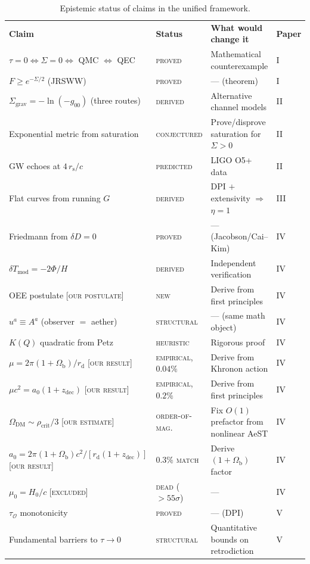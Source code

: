 \documentclass[prd,twocolumn,superscriptaddress,longbibliography,floatfix]{revtex4-2}
\newcommand{\tauasym}{\tau}
\newcommand{\rs}{r_{\mathrm{s}}}
\newcommand{\Sgrav}{\Sigma_{\mathrm{grav}}}
\newcommand{\tauO}{\tauasym_{\mathcal{O}}}
\newcommand{\Tmod}{T_{\mathrm{mod}}}
\newcommand{\OmDM}{\Omega_{\mathrm{DM}}}
\begin{document}
\begin{table}[t]
\caption{\label{tab:honest}Epistemic status of claims in
the unified framework.}
\begin{ruledtabular}
\begin{tabular}{llll}
\textbf{Claim} &
\textbf{Status} &
\textbf{What would change it} &
\textbf{Paper} \\
\colrule
$\tauasym = 0 \Leftrightarrow \Sigma = 0
\Leftrightarrow$ QMC $\Leftrightarrow$ QEC
& \textsc{proved} & Mathematical counterexample & I \\
$F \geq e^{-\Sigma/2}$ (JRSWW)
& \textsc{proved} & --- (theorem) & I \\
$\Sgrav = -\ln(-g_{00})$ (three routes)
& \textsc{derived} & Alternative channel models & II \\
Exponential metric from saturation
& \textsc{conjectured} & Prove/disprove saturation for $\Sigma > 0$ & II \\
GW echoes at $4\,\rs/c$
& \textsc{predicted} & LIGO O5+ data & II \\
Flat curves from running $G$
& \textsc{derived} & DPI $+$ extensivity $\Rightarrow$ $\eta=1$ & III \\
Friedmann from $\delta D = 0$
& \textsc{proved} & --- (Jacobson/Cai--Kim) & IV \\
$\delta\Tmod = -2\Phi/H$
& \textsc{derived} & Independent verification & IV \\
OEE postulate [\textsc{our postulate}]
& \textsc{new} & Derive from first principles & IV \\
$u^a \equiv A^a$ (observer $=$ aether)
& \textsc{structural} & --- (same math object) & IV \\
$K(Q)$ quadratic from Petz
& \textsc{heuristic} & Rigorous proof & IV \\
$\mu = 2\pi(1\!+\!\Omega_{\mathrm{b}})/r_{\mathrm{d}}$ [\textsc{our result}]
& \textsc{empirical, $0.04\%$} & Derive from Khronon action & IV \\
$\mu c^2 = a_0(1+z_{\mathrm{dec}})$ [\textsc{our result}]
& \textsc{empirical, $0.2\%$} & Derive from first principles & IV \\
$\OmDM \sim \rho_{\mathrm{crit}}/3$ [\textsc{our estimate}]
& \textsc{order-of-mag.} & Fix $O(1)$ prefactor from nonlinear AeST & IV \\
$a_0 = 2\pi(1\!+\!\Omega_{\mathrm{b}})c^2/[r_{\mathrm{d}}(1\!+\!z_{\mathrm{dec}})]$ [\textsc{our result}]
& \textsc{$0.3\%$ match} & Derive $(1\!+\!\Omega_{\mathrm{b}})$ factor & IV \\
$\mu_0 = H_0/c$ [\textsc{excluded}]
& \textsc{dead ($>55\sigma$)} & --- & IV \\
$\tauO$ monotonicity
& \textsc{proved} & --- (DPI) & V \\
Fundamental barriers to $\tauasym \to 0$
& \textsc{structural} & Quantitative bounds on retrodiction & V \\
\end{tabular}
\end{ruledtabular}
\end{table}
\end{document}
